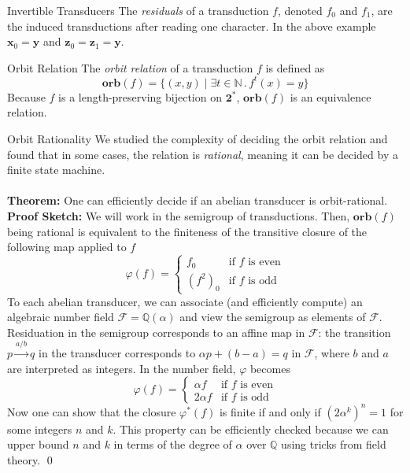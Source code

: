 \documentclass[a0]{a0poster}
\newcommand{\N}{\mathbb N}
\newcommand{\Q}{\mathbb Q}
\newcommand{\F}{\mathcal F}
\newcommand{\bin}{\pmb{\bm{2}}}
\newcommand{\orb}{\mathbf{orb}}
\begin{document}
\begin{multicols}{2}
\begin{poster-section}{Invertible Transducers}
The \emph{residuals} of a transduction $f$, denoted $f_0$ and $f_1$, are the
induced transductions after reading one character. In the above example
$\mathbf{x}_0 = \mathbf{y}$ and $\mathbf{z}_0 = \mathbf{z}_1 = \mathbf{y}$.
\end{poster-section}
\begin{poster-section}{Orbit Relation}
\Large
The \emph{orbit relation} of a transduction $f$ is defined as
\[
    \orb(f) = \{(x,y) \mid \exists t \in \N \,.\, f^t(x) = y\}
\]
Because $f$ is a length-preserving bijection on $\bin^*$,
$\orb(f)$ is an equivalence relation.
\end{poster-section}

\begin{poster-section}{Orbit Rationality}
    \Large
    We studied the complexity of deciding the orbit relation and found that
    in some cases, the relation is \emph{rational}, meaning it can be decided
    by a finite state machine.\\\\
    \textbf{Theorem:}
    One can efficiently decide if an abelian transducer is orbit-rational.\\

    \textbf{Proof Sketch:}
    We will work in the semigroup of transductions. Then, $\orb(f)$ being
    rational is equivalent to the finiteness of the transitive closure of the
    following map applied to $f$
    \[
        \varphi(f) = \begin{cases}
            f_0 &\text{if $f$ is even}\\
            (f^2)_0 &\text{if $f$ is odd}
        \end{cases}
    \]
    To each abelian transducer, we can associate (and efficiently compute) an
    algebraic number field $\F = \Q(\alpha)$ and view the semigroup as elements
    of $\F$.\\

    Residuation in the semigroup corresponds to an affine map in $\F$: the
    transition $p \xrightarrow{a / b} q$ in the transducer corresponds to
    $\alpha p + (b - a) = q$ in $\F$, where $b$ and $a$ are interpreted
    as integers. In the number field, $\varphi$ becomes
    \[
        \varphi(f) = \begin{cases}
            \alpha f &\text{if $f$ is even}\\
            2\alpha f &\text{if $f$ is odd}
        \end{cases}
    \]
    Now one can show that the closure $\varphi^*(f)$ is finite if and only if
    $(2\alpha^k)^n = 1$ for some integers $n$ and $k$. This property can be
    efficiently checked because we can upper bound $n$ and $k$ in terms of the
    degree of $\alpha$ over $\Q$ using tricks from field theory. \qed\\


\end{poster-section}
\end{multicols}
\end{document}
